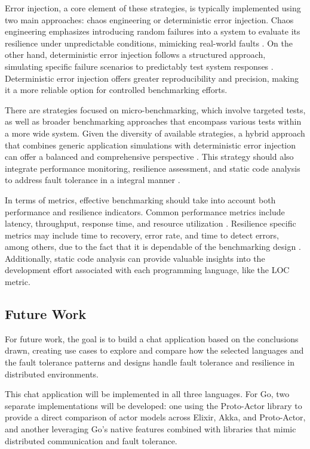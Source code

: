 Error injection, a core element of these strategies, is typically implemented using two main approaches: chaos engineering or deterministic error injection. Chaos engineering emphasizes introducing random failures into a system to evaluate its resilience under unpredictable conditions, mimicking real-world faults \cite{Almeida2013}. On the other hand, deterministic error injection follows a structured approach, simulating specific failure scenarios to predictably test system responses \cite{Randtoul2022}. Deterministic error injection offers greater reproducibility and precision, making it a more reliable option for controlled benchmarking efforts.

There are strategies focused on micro-benchmarking, which involve targeted tests, as well as broader benchmarking approaches that encompass various tests within a more wide system. Given the diversity of available strategies, a hybrid approach that combines generic application simulations with deterministic error injection can offer a balanced and comprehensive perspective \cite{Randtoul2022}. This strategy should also integrate performance monitoring, resilience assessment, and static code analysis to address fault tolerance in a integral manner \cite{Imam2014,Cardoso2013,Valkov2018,Randtoul2022}.

In terms of metrics, effective benchmarking should take into account both performance and resilience indicators. Common performance metrics include latency, throughput, response time, and resource utilization \cite{Imam2014,Valkov2018}. Resilience specific metrics may include time to recovery, error rate, and time to detect errors,  among others, due to the fact that it is dependable of the benchmarking design \cite{Randtoul2022,Blessing2019}. Additionally, static code analysis can provide valuable insights into the development effort associated with each programming language, like the \gls{LOC} metric.

\subsection{Future Work}

For future work, the goal is to build a chat application based on the conclusions drawn, creating use cases to explore and compare how the selected languages and the fault tolerance patterns and designs handle fault tolerance and resilience in distributed environments.

This chat application will be implemented in all three languages. For Go, two separate implementations will be developed: one using the Proto-Actor library to provide a direct comparison of actor models across Elixir, Akka, and Proto-Actor, and another leveraging Go’s native features combined with libraries that mimic distributed communication and fault tolerance.

